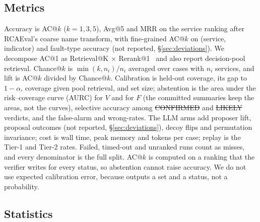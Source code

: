 \subsection{Metrics}
\label{sec:metrics}

Accuracy is AC@$k$ ($k = 1, 3, 5$), Avg@5 and MRR on the service ranking after RCAEval's coarse name transform, with fine-grained AC@$k$ on (service, indicator) and fault-type accuracy (not reported, \S\ref{sec:deviations}).
We decompose AC@1 as Retrieval@K $\times$ Rerank@1~\cite{decomprca2026} and also report decision-pool retrieval.
Chance@$k$ is $\min(k, n_i)/n_i$ averaged over cases with $n_i$ services, and lift is AC@$k$ divided by Chance@$k$.
Calibration is held-out coverage, its gap to $1-\alpha$, coverage given pool retrieval, and set size; abstention is the area under the risk--coverage curve (AURC) for $V$ and for $F$ (the committed summaries keep the areas, not the curves), selective accuracy among \st{CONFIRMED} and \st{LIKELY} verdicts, and the \NOFAULT false-alarm and wrong-\NOFAULT rates.
The LLM arms add proposer lift, proposal outcomes (not reported, \S\ref{sec:deviations}), decoy flips and permutation invariance; cost is wall time, peak memory and tokens per case; replay is the Tier-1 and Tier-2 rates.
Failed, timed-out and unranked runs count as misses, and every denominator is the full split.
AC@$k$ is computed on a ranking that the verifier writes for every status, so abstention cannot raise accuracy.
We do not use expected calibration error, because \sys outputs a set and a status, not a probability.

\subsection{Statistics}
\label{sec:stats}

